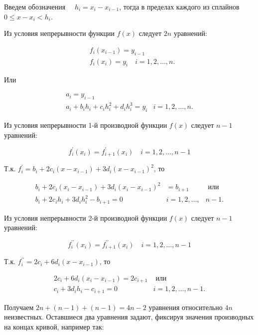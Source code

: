 \documentclass[10pt]{article}
\begin{document}
Введем обозначения $\quad h_{i}=x_{i}-x_{i-1}$, тогда в пределах каждого из сплайнов $0 \leq x-x_{i}<h_{i}$.

Из условия непрерывности функции $f(x)$ следует $2 n$ уравнений:

$$
\begin{aligned}
& f_{i}\left(x_{i-1}\right)=y_{i-1} \\
& f_{i}\left(x_{i}\right)=y_{i} \quad i=1,2, \ldots, n .
\end{aligned}
$$

Или

\[
\begin{array}{rl}
a_{i}=y_{i-1} & \\
a_{i}+b_{i} h_{i}+c_{i} h_{i}^{2}+d_{i} h_{i}^{3}=y_{i} & i=1,2, \ldots, n . \tag{5.6}
\end{array}
\]

Из условия непрерывности 1-й производной функции $f(x)$ следует $n-1$ уравнений:

$$
f_{i}^{\prime}\left(x_{i}\right)=f_{i+1}^{\prime}\left(x_{i}\right) \quad i=1,2, \ldots, n-1
$$

Т.к. $f_{i}^{\prime}=b_{i}+2 c_{i}\left(x-x_{i-1}\right)+3 d_{i}\left(x-x_{i-1}\right)^{2}$, то

\[
\begin{array}{ccc}
b_{i}+2 c_{i}\left(x_{i}-x_{i-1}\right)+3 d_{i}\left(x_{i}-x_{i-1}\right)^{2} & =b_{i+1} & \text { или } \\
b_{i}+2 c_{i} h_{i}+3 d_{i} h_{i}^{2}-b_{i+1}=0 & i=1,2, \ldots, & n-1 . \tag{5.7}
\end{array}
\]

Из условия непрерывности 2-й производной функции $f(x)$ следует $n-1$ уравнений:

$$
f_{i}^{\prime \prime}\left(x_{i}\right)=f_{i+1}^{\prime \prime}\left(x_{i}\right) \quad i=1,2, \ldots, n-1
$$

Т.к. $f_{i}^{\prime \prime}=2 c_{i}+6 d_{i}\left(x-x_{i-1}\right)$, то

\[
\begin{array}{rl}
2 c_{i}+6 d_{i}\left(x_{i}-x_{i-1}\right)=2 c_{i+1} & \text { или } \\
c_{i}+3 d_{i} h_{i}-c_{i+1}=0 & i=1,2, \ldots, n-1 . \tag{5.8}
\end{array}
\]

Получаем $2 n+(n-1)+(n-1)=4 n-2$ уравнения относительно $4 n$ неизвестных. Оставшиеся два уравнения задают, фиксируя значения производных на концах кривой, например так:
\end{document}
